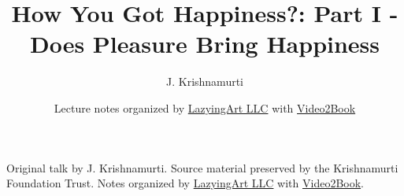 \documentclass[11pt,oneside]{book}
\begin{document}
\frontmatter
\title{How You Got Happiness?: Part I - Does Pleasure Bring Happiness}
\author{J. Krishnamurti}
\date{Lecture notes organized by \href{https://lazying.art}{LazyingArt LLC} with \href{https://github.com/lachlanchen/Video2Book}{Video2Book}}
\maketitle
\begin{center}
\small Original talk by J. Krishnamurti. Source material preserved by the Krishnamurti Foundation Trust. Notes organized by \href{https://lazying.art}{LazyingArt LLC} with \href{https://github.com/lachlanchen/Video2Book}{Video2Book}.
\end{center}
\clearpage
\mainmatter

\end{document}
